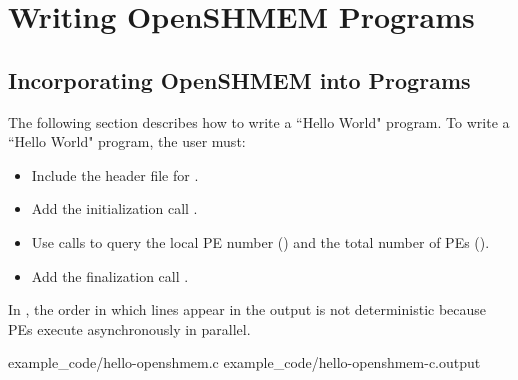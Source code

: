 \clearpage %

\appendix

\pagestyle{fancy} \withlinenumbers
\fancyhf{}
\fancyhead[RE, LO]{\leftmark}
\fancyhead[RO, LE]{\thepage}
\fancyfoot[CE, CO]{\thepage}
\renewcommand{\headrulewidth}{0pt}




\chapter{Writing OpenSHMEM Programs}
\section*{Incorporating OpenSHMEM into Programs}\label{sec:writing_programs}

The following section describes how to write a ``Hello World" \openshmem program.
To write a ``Hello World" \openshmem program, the user must:

\begin{itemize}
\item Include the header file  for \Cstd.
\item Add the initialization call \hyperref[subsec:shmem_init]{}.
\item Use \openshmem calls to query the local \ac{PE} number
    (\hyperref[subsec:shmem_my_pe]{}) and the total number
    of \acp{PE} (\hyperref[subsec:shmem_n_pes]{}).
\item Add the finalization call \hyperref[subsec:shmem_finalize]{}.
\end{itemize}

In \openshmem, the order in which lines appear in the output is not
deterministic because \acp{PE} execute asynchronously in parallel.

\begin{minipage}{\linewidth}
\vspace{0.1in}
                {example_code/hello-openshmem.c}
                {example_code/hello-openshmem-c.output}
\vspace{0.1in}
\end{minipage}

